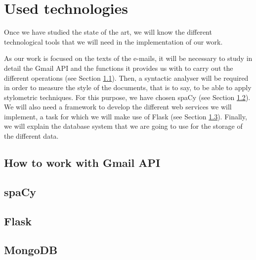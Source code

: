 \chapter{Used technologies}
\label{cap:usedtech}


Once we have studied the state of the art, we will know the different technological tools that we will need in the implementation of our work.

As our work is focused on the texts of the e-mails, it will be necessary to study in detail the Gmail API and the functions it provides us with to carry out the different operations (see Section \ref{sect:gmailapitech}). Then, a syntactic analyser will be required in order to measure the style of the documents, that is to say, to be able to apply stylometric techniques. For this purpose, we have chosen spaCy (see Section \ref{sect:spacy}). We will also need a framework to develop the different web services we will implement, a task for which we will make use of Flask (see Section \ref{sect:flask}). Finally, we will explain the database system that we are going to use for the storage of the different data.

\section{How to work with Gmail API}\label{sect:gmailapitech}


\section{spaCy}\label{sect:spacy}


\section{Flask}\label{sect:flask}


\section{MongoDB}\label{sect:mongo}
